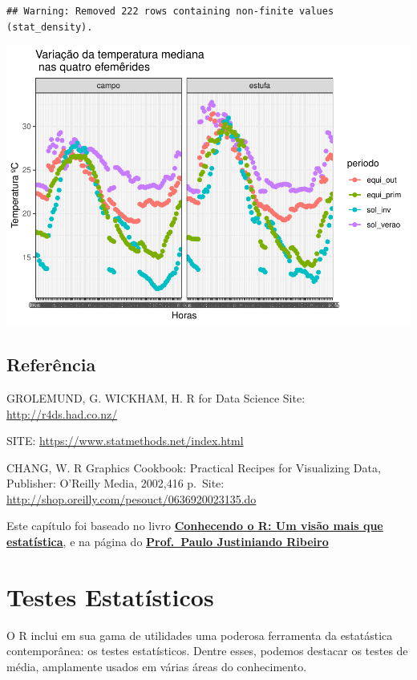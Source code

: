 \documentclass[
]{book}
\begin{document}
\begin{verbatim}
## Warning: Removed 222 rows containing non-finite values (stat_density).
\end{verbatim}

\includegraphics{TudodoR_files/figure-latex/unnamed-chunk-245-1.pdf}

\hypertarget{referuxeancia-3}{%
\section{Referência}\label{referuxeancia-3}}

GROLEMUND, G. WICKHAM, H. R for Data Science Site: \url{http://r4ds.had.co.nz/}

SITE: \url{https://www.statmethods.net/index.html}

CHANG, W. R Graphics Cookbook: Practical Recipes for Visualizing Data, Publisher: O'Reilly Media, 2002,416 p.~Site: \url{http://shop.oreilly.com/pesouct/0636920023135.do}

Este capítulo foi baseado no livro \href{https://www.editoraufv.com.br/produto/conhecendo-o-r-uma-visao-mais-que-estatistica/1109294}{\textbf{Conhecendo o R: Um visão mais que estatística}}, e na página do \href{http://www.leg.ufpr.br/~paulojus/}{\textbf{Prof.~Paulo Justiniando Ribeiro}}

\hypertarget{testes-estatuxedsticos}{%
\chapter{Testes Estatísticos}\label{testes-estatuxedsticos}}

O R inclui em sua gama de utilidades uma poderosa ferramenta da estatástica contemporânea: os testes estatísticos. Dentre esses, podemos destacar os testes de média, amplamente usados em várias áreas do conhecimento.
\end{document}
